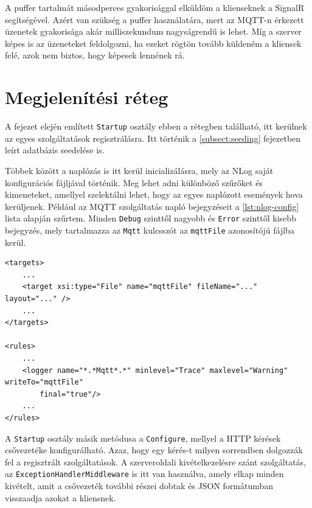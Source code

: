 A puffer tartalmát másodperces gyakorisággal elküldöm a klienseknek a SignalR segítségével. 
Azért van szükség a puffer használatára, mert az MQTT-n érkezett üzenetek gyakorisága akár milliszekundum  nagyságrendű is lehet. 
Míg a szerver képes is az üzeneteket feldolgozni, ha ezeket rögtön tovább küldeném a kliensek felé, azok nem biztos, hogy képesek lennének rá.

\section{Megjelenítési réteg}
A fejezet elején említett \verb+Startup+ osztály ebben a rétegben található, itt kerülnek az egyes szolgáltatások regisztrálásra.
Itt történik a \ref{subsect:seeding} fejezetben leírt adatbázis seedelése is.

Többek között a naplózás is itt kerül inicializálásra, mely az NLog saját konfigurációs fájljával történik.
Meg lehet adni különböző szűrőket és kimeneteket, amellyel szelektálni lehet, hogy az egyes naplózott események hova kerüljenek.
Például az MQTT szolgáltatás napló bejegyzéseit a \ref{lst:nlog-config} lista alapján szűrtem.
Minden \verb+Debug+ szinttől nagyobb és \verb+Error+ szinttől kisebb bejegyzés, mely tartalmazza az \verb+Mqtt+ kulcsszót az \verb+mqttFile+ azonosítójú fájlba kerül.

\begin{lstlisting}[style=xml, caption=Az NLog.config fájl egy részlete, label=lst:nlog-config]
<targets>
    ...
    <target xsi:type="File" name="mqttFile" fileName="..." layout="..." />
    ...
</targets>

<rules>
    ...
    <logger name="*.*Mqtt*.*" minlevel="Trace" maxlevel="Warning" writeTo="mqttFile" 
        final="true"/>
    ...
</rules>
\end{lstlisting}

A \verb+Startup+ osztály másik metódusa a \verb+Configure+, mellyel a HTTP kérések csővezetéke konfigurálható.
Azaz, hogy egy kérés-t milyen sorrendben dolgozzák fel a regisztrált szolgáltatások.
A szerveroldali kivételkezelésre szánt szolgáltatás, az \verb+ExceptionHandlerMiddleware+ is itt van használva, 
amely elkap minden kivételt, amit a csővezeték további részei dobtak és JSON formátumban visszaadja azokat a kliensnek.

